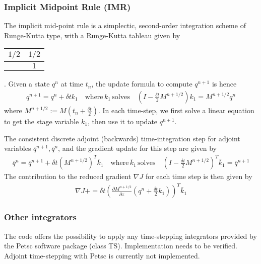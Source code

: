 \documentclass[letterpaper]{article}
\begin{document}
    \subsubsection{Implicit Midpoint Rule (IMR)} 
    The implicit mid-point rule is a simplectic, second-order integration scheme
    of Runge-Kutta type, with a Runge-Kutta tableau given by
    \begin{tabular}{ c | c }
      $1/2$ & $ 1/2$ \\
      \hline
                &  $1$
    \end{tabular}.
    Given a state $q^n$ at time $t_n$, the update formula to compute $q^{n+1}$
    is hence 
    \begin{align}
      q^{n+1} = q^n + \delta t k_1 \quad \text{where} \, k_1 \, \text{solves}
      \quad \left( I-\frac{\delta t}{2} M^{n+1/2} \right) k_1 = M^{n+1/2}  q^n
    \end{align}
    where $M^{n+1/2} := M(t_n + \frac{\delta t}{2})$. In each time-step, we
    first solve a linear equation to get the stage variable $k_1$, then use it
    to update $q^{n+1}$. 

    The consistent discrete adjoint (backwards) time-integration step for
    adjoint variables $\bar q^{n+1}, \bar q^n$, and the gradient update for this
    step are given by
    \begin{align}
      \bar q^{n} = \bar q^{n+1} + \delta t \left(M^{n+1/2}\right)^T \bar k_1
      \quad \text{where} \, \bar k_1 \, \text{solves} \quad \left(
      I-\frac{\delta t}{2} M^{n+1/2}\right)^T  \bar k_1 = \bar q^{n+1} 
    \end{align}
    The contribution to the reduced gradient $\nabla J$ for each time step is
    then given by
    \begin{align}
      \nabla J += \delta t \left( \frac{\partial M^{n+1/2}}{\partial z}
      \left(q^n + \frac{\delta t}{2} k_1\right) \right)^T\bar k_1
    \end{align}


    \subsubsection{Other integrators}
    The code offers the possibility to apply any time-stepping integrators
    provided by the Petsc software package (class TS). Implementation needs to
    be verified. Adjoint time-stepping with Petsc is currently not
    implemented. 
\end{document}
